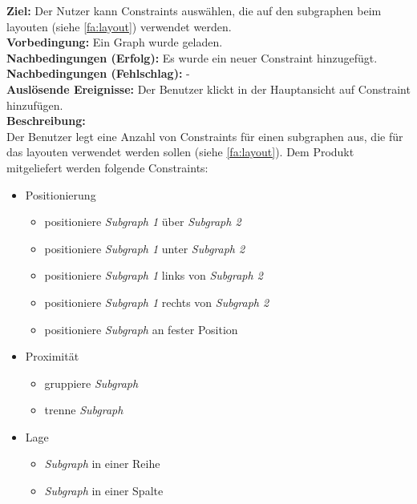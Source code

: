 \label{fa:constraints}
\textbf{Ziel:} Der Nutzer kann Constraints auswählen, die auf den \gls{subgraph}en beim layouten (siehe \ref{fa:layout}) verwendet werden.\\
\textbf{Vorbedingung:} Ein Graph wurde geladen.\\
\textbf{Nachbedingungen (Erfolg):} Es wurde ein neuer Constraint hinzugefügt.\\
\textbf{Nachbedingungen (Fehlschlag):} -\\
\textbf{Auslösende Ereignisse:} Der Benutzer klickt in der Hauptansicht auf Constraint hinzufügen.\\
\textbf{Beschreibung: } \\
Der Benutzer legt eine Anzahl von Constraints für einen \gls{subgraph}en aus, die für das layouten verwendet werden sollen (siehe \ref{fa:layout}).
Dem Produkt mitgeliefert werden folgende Constraints: %
\begin{itemize}[nolistsep]
  \item Positionierung
  \begin{itemize}[nolistsep]
    \item positioniere \textit{Subgraph 1} über \textit{Subgraph 2}
    \item positioniere \textit{Subgraph 1} unter \textit{Subgraph 2}
    \item positioniere \textit{Subgraph 1} links von \textit{Subgraph 2}
    \item positioniere \textit{Subgraph 1} rechts von \textit{Subgraph 2}
    \item positioniere \textit{Subgraph} an fester Position
  \end{itemize}
  \item Proximität
  \begin{itemize}[nolistsep]
    \item gruppiere \textit{Subgraph}
    \item trenne \textit{Subgraph}
  \end{itemize}
  \item Lage
  \begin{itemize}[nolistsep]
    \item \textit{Subgraph} in einer Reihe
    \item \textit{Subgraph} in einer Spalte
  \end{itemize}
\end{itemize}

